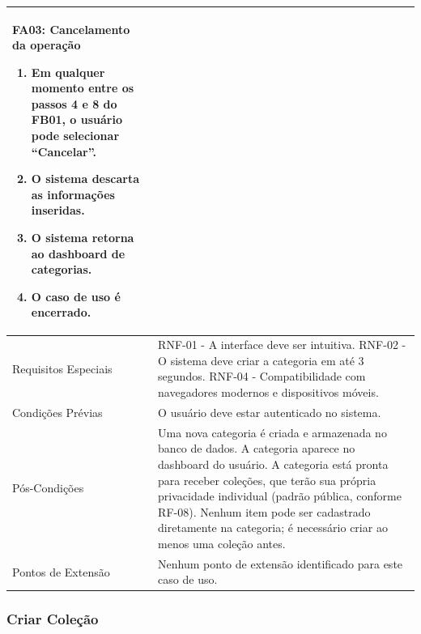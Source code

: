 \begin{longtable}{ >{\raggedright}p{2.8cm} | >{\raggedright\arraybackslash}p{10.7cm} }
\textbf{FA03:} Cancelamento da operação
\vspace{2pt}
\begin{enumerate}[nosep,leftmargin=1.2em,topsep=0pt,partopsep=0pt,parsep=0pt,itemsep=0pt,after=\vspace{2pt}]
	\item Em qualquer momento entre os passos 4 e 8 do FB01, o usuário pode selecionar ``Cancelar''.
	\item O sistema descarta as informações inseridas.
	\item O sistema retorna ao dashboard de categorias.
	\item O caso de uso é encerrado.
\end{enumerate}
\mbox{} \\ \hline

Requisitos Especiais & RNF-01 - A interface deve ser intuitiva. RNF-02 - O sistema deve criar a categoria em até 3 segundos. RNF-04 - Compatibilidade com navegadores modernos e dispositivos móveis. \\ \hline

Condições Prévias & O usuário deve estar autenticado no sistema. \\ \hline

Pós-Condições & Uma nova categoria é criada e armazenada no banco de dados. A categoria aparece no dashboard do usuário. A categoria está pronta para receber coleções, que terão sua própria privacidade individual (padrão pública, conforme RF-08). Nenhum item pode ser cadastrado diretamente na categoria; é necessário criar ao menos uma coleção antes. \\ \hline

Pontos de Extensão & Nenhum ponto de extensão identificado para este caso de uso. \\
\end{longtable}
\renewcommand{\arraystretch}{1}
\FloatBarrier



\subsubsection{Criar Coleção}

